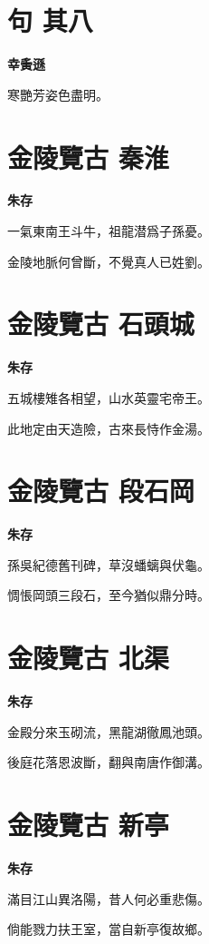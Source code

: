 \documentclass[12pt,a4paper]{ctexbook}
\begin{document}
\section{句  其八}
\textbf{幸夤遜}\par\vspace{0.5em}
寒艷芳姿色盡明。\par

\section{金陵覽古 秦淮}
\textbf{朱存}\par\vspace{0.5em}
一氣東南王斗牛，祖龍潜爲子孫憂。\par
金陵地脈何曾斷，不覺真人已姓劉。\par

\section{金陵覽古 石頭城}
\textbf{朱存}\par\vspace{0.5em}
五城樓雉各相望，山水英靈宅帝王。\par
此地定由天造險，古來長恃作金湯。\par

\section{金陵覽古 段石岡}
\textbf{朱存}\par\vspace{0.5em}
孫吳紀德舊刊碑，草沒蟠螭與伏龜。\par
惆悵岡頭三段石，至今猶似鼎分時。\par

\section{金陵覽古 北渠}
\textbf{朱存}\par\vspace{0.5em}
金殿分來玉砌流，黑龍湖徹鳳池頭。\par
後庭花落恩波斷，翻與南唐作御溝。\par

\section{金陵覽古 新亭}
\textbf{朱存}\par\vspace{0.5em}
滿目江山異洛陽，昔人何必重悲傷。\par
倘能戮力扶王室，當自新亭復故鄉。\par
\end{document}
